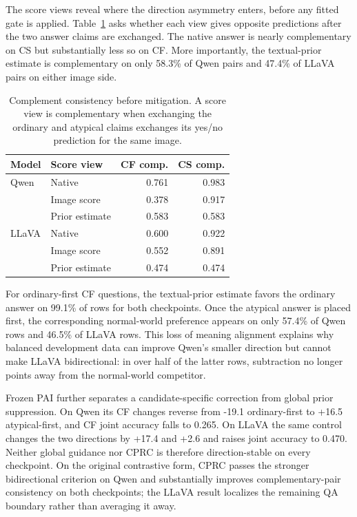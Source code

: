 \documentclass[letterpaper]{article}
\begin{document}
The score views reveal where the direction asymmetry enters, before any fitted
gate is applied. Table~\ref{tab:prior-direction} asks whether each view gives
opposite predictions after the two answer claims are exchanged. The native
answer is nearly complementary on CS but substantially less so on CF. More
importantly, the textual-prior estimate is complementary on only 58.3\% of Qwen pairs
and 47.4\% of LLaVA pairs on either image side.

\begin{table}[t]
\centering
\small
\begin{tabular}{llrr}
\toprule
Model & Score view & CF comp. & CS comp. \\
\midrule
Qwen & Native & 0.761 & 0.983 \\
 & Image score & 0.378 & 0.917 \\
 & Prior estimate & 0.583 & 0.583 \\
\midrule
LLaVA & Native & 0.600 & 0.922 \\
 & Image score & 0.552 & 0.891 \\
 & Prior estimate & 0.474 & 0.474 \\
\bottomrule
\end{tabular}
\caption{Complement consistency before mitigation. A score view is
complementary when exchanging the ordinary and atypical claims exchanges its
yes/no prediction for the same image.}
\label{tab:prior-direction}
\end{table}

For ordinary-first CF questions, the textual-prior estimate favors the ordinary answer
on 99.1\% of rows for both checkpoints. Once the atypical answer is placed
first, the corresponding normal-world preference appears on only 57.4\% of
Qwen rows and 46.5\% of LLaVA rows. This loss of meaning alignment explains
why balanced development data can improve Qwen's smaller direction but cannot
make LLaVA bidirectional: in over half of the latter rows, subtraction no longer
points away from the normal-world competitor.

Frozen PAI further separates a candidate-specific correction from global prior
suppression. On Qwen its CF changes reverse from -19.1 ordinary-first to +16.5
atypical-first, and CF joint accuracy falls to 0.265. On LLaVA the same control
changes the two directions by +17.4 and +2.6 and raises joint accuracy to 0.470.
Neither global guidance nor CPRC is therefore direction-stable on every
checkpoint. On the original contrastive form, CPRC passes the stronger
bidirectional criterion on Qwen and
substantially improves complementary-pair consistency on both checkpoints; the
LLaVA result localizes the remaining QA boundary rather than averaging it away.
\end{document}

